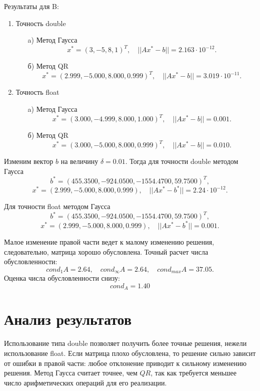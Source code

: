 \documentclass[12pt, a4paper]{article}
\begin{document}
Результаты для B:
\begin{enumerate}
\item Точность double
	\begin{enumerate}
	\item[a)] Метод Гаусса
	$$x^* = (3 , -5, 8 ,1)^{T},\quad ||Ax^{*}-b|| = 2{.}163\cdot10^{-12}.$$
	\item[б)] Метод QR
	$$x^* = (2{.}999 , -5{.}000, 8{.}000 ,0{.}999)^{T},\quad ||Ax^{*}-b|| = 3{.}019\cdot10^{-11}.$$
	\end{enumerate}
\item Точность float
	\begin{enumerate}
	\item[a)] Метод Гаусса
	$$x^* = (3{.}000 , -4{.}999, 8{.}000, 1{.}000)^{T},\quad ||Ax^{*}-b|| = 0{.}001.$$
	\item[б)] Метод QR
	$$x^* = (3{.}000 , -5{.}000, 8{.}000, 0{.}999)^{T},\quad ||Ax^{*}-b|| = 0{.}010.$$
	\end{enumerate}
\end{enumerate}
Изменим вектор $b$ на величину $\delta = 0.01$. Тогда для точности double методом Гаусса
$$b^* = (455.3500, -924{.}0500, -1554{.}4700, 59{.}7500)^T,$$
$$x^* = (2{.}999, -5{.}000, 8{.}000, 0{.}999), \quad ||Ax^{*}-b^*|| =  2{.}24\cdot10^{-12}.$$

Для точности float методом Гаусса
$$b^* = (455.3500, -924{.}0500, -1554{.}4700, 59{.}7500)^T,$$
$$x^* = (2{.}999, -5{.}000, 8{.}000, 0{.}999), \quad ||Ax^{*}-b^*|| =  0{.}001.$$

Малое изменение правой части ведет к малому изменению решения, следовательно, матрица хорошо обусловлена. Точный расчет числа обусловленности: 
$$cond_1A = 2{.}64,\quad cond_{\infty}A = 2{.}64, \quad cond_{max}A = 37{.}05.$$
Оценка числа обусловленности снизу:
$$cond_A = 1{.}40$$
\newpage

\section{Анализ результатов}
Использование типа double позволяет получить более точные решения,
нежели использование float. Если матрица плохо обусловлена, то решение сильно зависит от ошибки в правой части: любое отклонение приводит к сильному изменению решения. Метод Гаусса считает точнее, чем $QR$, так как требуется меньшее число арифметических операций для его реализации.

\newpage
\end{document}
